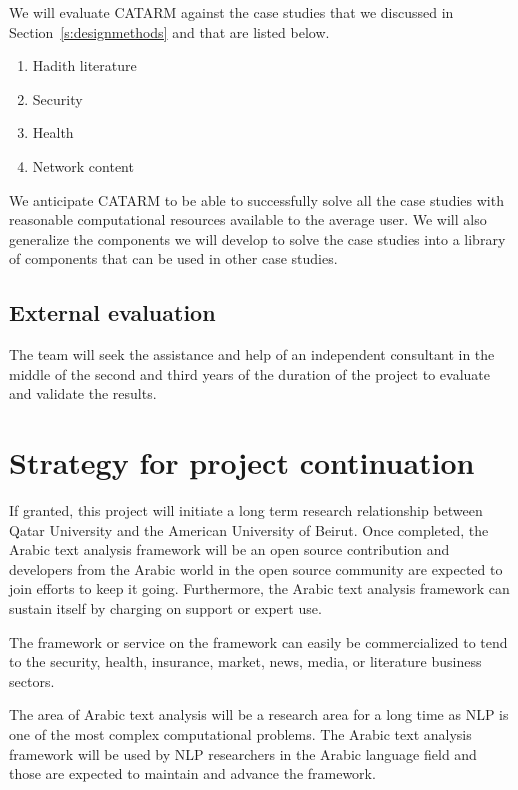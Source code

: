 \documentclass[12pt]{article}
\begin{document}
We will evaluate CATARM against the case studies
that we discussed in Section~\ref{s:designmethods}
and that are listed below. 
\begin{enumerate}
\item Hadith literature
\item Security
\item Health
\item Network content
\end{enumerate}

We anticipate CATARM to be able to successfully solve all the case
studies with reasonable computational resources available to the 
average user. 
We will also generalize the components we will develop to solve
the case studies into a library of components that can be used
in other case studies. 

\subsection{External evaluation }

The team will seek the assistance and help of an independent 
consultant in the middle of the second and third years of 
the duration of the project to evaluate and validate the results.

\section{Strategy for project continuation}
\label{s:continue}

If granted, this project will initiate a long term
research relationship between Qatar University
and the American University of Beirut. 
Once completed, the Arabic text analysis framework will be 
an open source contribution and developers from the Arabic 
world in the open source community are expected to join 
efforts to keep it going.
Furthermore, the Arabic text analysis framework 
can sustain itself by charging on support or expert use.

The framework or service on the framework can easily be 
commercialized to tend to the security, health, insurance, market,
news, media, or literature business sectors.
 
The area of Arabic text analysis will be a research area for 
a long time as NLP is one of the most complex computational 
problems.
The Arabic text analysis framework will be used by NLP 
researchers in the Arabic language field and those are 
expected to maintain and advance the framework.
\end{document}
